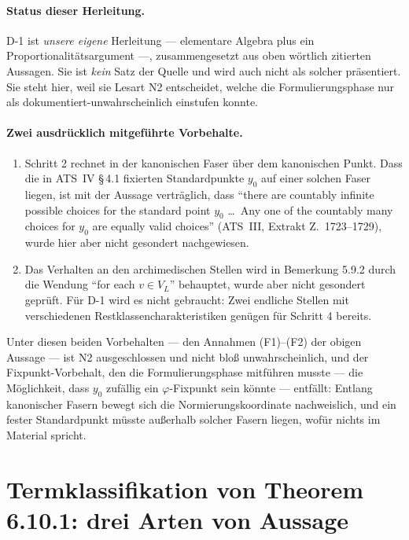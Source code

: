 \documentclass[11pt,a4paper]{article}
\theoremstyle{definition}
\theoremstyle{plain}
\theoremstyle{definition}
\newcommand{\anchor}[2]{(#1, Extrakt Z.~#2)}
\begin{document}
\paragraph{Status dieser Herleitung.}
D-1 ist \emph{unsere eigene} Herleitung --- elementare Algebra plus ein
Proportionalitätsargument ---, zusammengesetzt aus oben wörtlich zitierten Aussagen.
Sie ist \emph{kein} Satz der Quelle und wird auch nicht als solcher präsentiert. Sie
steht hier, weil sie Lesart N2 entscheidet, welche die Formulierungsphase nur als
\glqq dokumentiert-unwahrscheinlich\grqq{} einstufen konnte.

\paragraph{Zwei ausdrücklich mitgeführte Vorbehalte.}
\begin{enumerate}
\item[(i)] Schritt 2 rechnet in der kanonischen Faser über dem kanonischen Punkt.
  Dass die in ATS~IV \S\,4.1 fixierten Standardpunkte $y_0$ auf einer solchen Faser
  liegen, ist mit der Aussage verträglich, dass ``there are countably infinite
  possible choices for the standard point $y_0$ \ldots\ Any one of the countably
  many choices for $y_0$ are equally valid choices'' \anchor{ATS~III}{1723--1729},
  wurde hier aber nicht gesondert nachgewiesen.
\item[(ii)] Das Verhalten an den archimedischen Stellen wird in Bemerkung 5.9.2
  durch die Wendung ``for each $v \in V_L$'' behauptet, wurde aber nicht gesondert
  geprüft. Für D-1 wird es nicht gebraucht: Zwei endliche Stellen mit verschiedenen
  Restklassencharakteristiken genügen für Schritt 4 bereits.
\end{enumerate}

Unter diesen beiden Vorbehalten --- den Annahmen (F1)--(F2) der obigen Aussage ---
ist N2 ausgeschlossen und nicht bloß unwahrscheinlich,
und der Fixpunkt-Vorbehalt, den die Formulierungsphase mitführen musste --- die
Möglichkeit, dass $y_0$ zufällig ein $\varphi$-Fixpunkt sein könnte --- entfällt:
Entlang kanonischer Fasern bewegt sich die Normierungskoordinate nachweislich, und
ein fester Standardpunkt müsste außerhalb solcher Fasern liegen, wofür nichts im
Material spricht.

\section{Termklassifikation von Theorem 6.10.1: drei Arten von Aussage}
\label{sec:terms}
\end{document}
